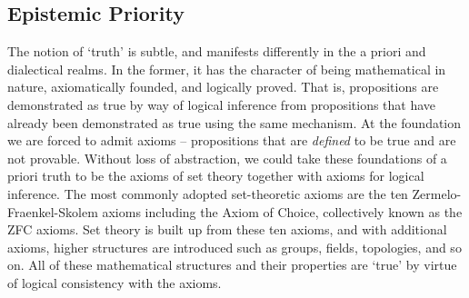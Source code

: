 \documentclass[pra,twocolumn,groupedaddress,10pt]{revtex4}
\theoremstyle{definition}
\begin{document}
\subsection{Epistemic Priority} \label{sec:epipri}

The notion of `truth' is subtle, and manifests differently in the a priori and dialectical realms. In the former, it has the character of being mathematical in nature, axiomatically founded, and logically proved. That is, propositions are demonstrated as true by way of logical inference from propositions that have already been demonstrated as true using the same mechanism. At the foundation we are forced to admit axioms -- propositions that are \emph{defined} to be true and are not provable. Without loss of abstraction, we could take these foundations of a priori truth to be the axioms of set theory together with axioms for logical inference. The most commonly adopted set-theoretic axioms are the ten Zermelo-Fraenkel-Skolem axioms including the Axiom of Choice, collectively known as the ZFC axioms. Set theory is built up from these ten axioms, and with additional axioms, higher structures are introduced such as groups, fields, topologies, and so on. All of these mathematical structures and their properties are `true' by virtue of logical consistency with the axioms.
\end{document}
